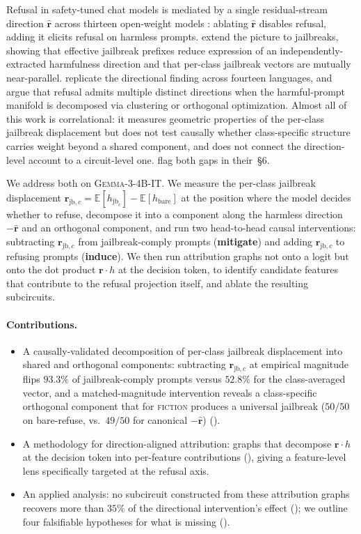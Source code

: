 \documentclass{article}
\newcommand{\rhat}{\hat{\bm{r}}}
\newcommand{\rvec}{\bm{r}}
\newcommand{\rjbc}{\bm{r}_{\mathrm{jb},c}}
\newcommand{\gemma}{\textsc{Gemma-3-4B-IT}}
\begin{document}
Refusal in safety-tuned chat models is mediated by a single
residual-stream direction $\rhat$ across thirteen open-weight models
\citep{arditi2024refusal}: ablating $\rhat$ disables refusal, adding
it elicits refusal on harmless prompts. \citet{ball2024jailbreaks}
extend the picture to jailbreaks, showing that effective jailbreak
prefixes reduce expression of an independently-extracted harmfulness
direction and that per-class jailbreak vectors are mutually
near-parallel. \citet{wang2025refusal} replicate the directional
finding across fourteen languages, and
\citet{piras2026som,wollschlager2025geometry} argue that refusal
admits multiple distinct directions when the harmful-prompt manifold
is decomposed via clustering or orthogonal optimization. Almost all
of this work is correlational: it measures geometric properties of
the per-class jailbreak displacement but does not test causally
whether class-specific structure carries weight beyond a shared
component, and does not connect the direction-level account to a
circuit-level one. \citet{ball2024jailbreaks} flag both gaps in
their~\S6.

We address both on \gemma{}. We measure the per-class jailbreak
displacement $\rjbc = \mathbb{E}[h_{\mathrm{jb}_c}] -
\mathbb{E}[h_{\mathrm{bare}}]$ at the position where the model
decides whether to refuse, decompose it into a component along the
harmless direction $-\rhat$ and an orthogonal component, and run two
head-to-head causal interventions: subtracting $\rjbc$ from
jailbreak-comply prompts (\textbf{mitigate}) and adding $\rjbc$ to
refusing prompts (\textbf{induce}). We then run attribution graphs
not onto a logit but onto the dot product $\rvec \cdot h$ at the
decision token, to identify candidate features that contribute to
the refusal projection itself, and ablate the resulting subcircuits.

\paragraph{Contributions.}
\begin{itemize}[leftmargin=*,topsep=2pt,itemsep=2pt]
\item A causally-validated decomposition of per-class jailbreak
displacement into shared and orthogonal components: subtracting
$\rjbc$ at empirical magnitude flips $93.3\%$ of jailbreak-comply
prompts versus $52.8\%$ for the class-averaged vector, and a
matched-magnitude intervention reveals a class-specific orthogonal
component that for \textsc{fiction} produces a universal jailbreak
($50/50$ on bare-refuse, vs.\ $49/50$ for canonical $-\rhat$)
().
\item A methodology for direction-aligned attribution: graphs that
decompose $\rvec \cdot h$ at the decision token into per-feature
contributions (), giving a feature-level
lens specifically targeted at the refusal axis.
\item An applied analysis: no subcircuit constructed from these
attribution graphs recovers more than $35\%$ of the directional
intervention's effect (); we outline four
falsifiable hypotheses for what is missing
().
\end{itemize}
\end{document}

